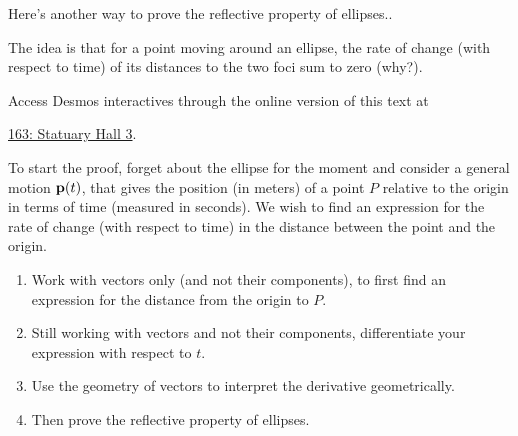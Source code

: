 \documentclass{ximera}
\begin{document}
\begin{question}  \label{Q5445rggfbhyhyrdt}
Here's another way to prove the reflective property of ellipses..

The idea is that for a point moving around an ellipse, the rate of change (with respect to time) of its distances to the two foci sum to zero (why?).

\begin{onlineOnly}
    \begin{center}
\end{center}
\end{onlineOnly}

Access Desmos interactives through the online version of this text at
 
\href{https://www.desmos.com/3d/c9iyyxoqre}{163: Statuary Hall 3}.


To start the proof, forget about the ellipse for the moment and consider a general motion ${\bf p}(t)$, that gives the position (in meters) of a point $P$ relative to the origin in terms of time (measured in seconds). We wish to find an expression for the rate of change (with respect to time) in the distance between the point and the origin.

\begin{enumerate}
\item Work with vectors only (and not their components), to first find an expression for the distance from the origin to $P$.

\item Still working with vectors and not their components, differentiate your expression with respect to $t$.

\item Use the geometry of vectors to interpret the derivative geometrically.

\item Then prove the reflective property of ellipses. 
\end{enumerate}
\end{question}
\end{document}
